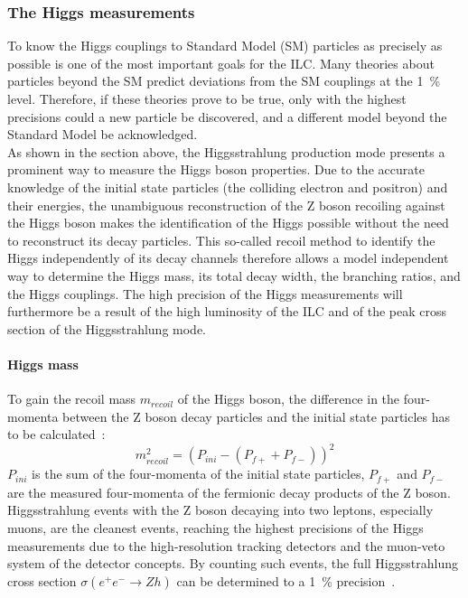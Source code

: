 \subsubsection{The Higgs measurements}
To know the Higgs couplings to Standard Model (SM) particles as precisely as possible is one of the most important goals for the ILC.
Many theories about particles beyond the SM predict deviations from the SM couplings at the \SI{1}{\percent} level.
Therefore, if these theories prove to be true, only with the highest precisions could a new particle be discovered, and a different model beyond the Standard Model be acknowledged.
\\As shown in the section above, the Higgsstrahlung production mode presents a prominent way to measure the Higgs boson properties.
Due to the accurate knowledge of the initial state particles (the colliding electron and positron) and their energies, the unambiguous reconstruction of the Z boson recoiling against the Higgs boson makes the identification of the Higgs possible without the need to reconstruct its decay particles.
This so-called recoil method to identify the Higgs independently of its decay channels therefore allows a model independent way to determine the Higgs mass, its total decay width, the branching ratios, and the Higgs couplings. 
The high precision of the Higgs measurements will furthermore be a result of the high luminosity of the ILC and of the peak cross section of the Higgsstrahlung mode.

\paragraph{Higgs mass}
To gain the recoil mass $m_{recoil}$ of the Higgs boson, the difference in the four-momenta between the Z boson decay particles and the initial state particles has to be calculated~\cite[p. 7]{ILCPhysics}:
\begin{equation}
 m_{recoil}^2=(P_{ini}-(P_{f+}+P_{f-}))^2
\end{equation}
$P_{ini}$ is the sum of the four-momenta of the initial state particles, $P_{f+}$ and $P_{f-}$ are the measured four-momenta of the fermionic decay products of the Z boson.\\
Higgsstrahlung events with the Z boson decaying into two leptons, especially muons, are the cleanest events, reaching the highest precisions of the Higgs measurements due to the high-resolution tracking detectors and the muon-veto system of the detector concepts.
By counting such events, the full Higgsstrahlung cross section $\sigma(e^+e^-\rightarrow Zh)$ can be determined to a \SI{1}{\percent} precision~\cite[p. 12]{PhysicsCase}.


